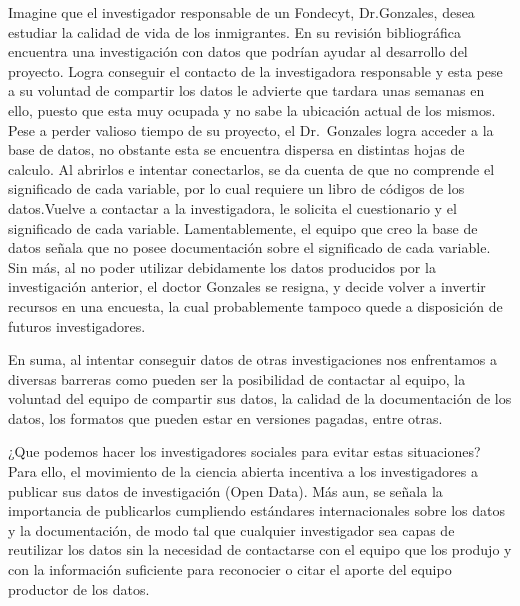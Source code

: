 \documentclass[
  14pt,
]{book}
\begin{document}
Imagine que el investigador responsable de un Fondecyt, Dr.Gonzales, desea estudiar la calidad de vida de los inmigrantes. En su revisión bibliográfica encuentra una investigación con datos que podrían ayudar al desarrollo del proyecto. Logra conseguir el contacto de la investigadora responsable y esta pese a su voluntad de compartir los datos le advierte que tardara unas semanas en ello, puesto que esta muy ocupada y no sabe la ubicación actual de los mismos. Pese a perder valioso tiempo de su proyecto, el Dr.~Gonzales logra acceder a la base de datos, no obstante esta se encuentra dispersa en distintas hojas de calculo. Al abrirlos e intentar conectarlos, se da cuenta de que no comprende el significado de cada variable, por lo cual requiere un libro de códigos de los datos.Vuelve a contactar a la investigadora, le solicita el cuestionario y el significado de cada variable. Lamentablemente, el equipo que creo la base de datos señala que no posee documentación sobre el significado de cada variable. Sin más, al no poder utilizar debidamente los datos producidos por la investigación anterior, el doctor Gonzales se resigna, y decide volver a invertir recursos en una encuesta, la cual probablemente tampoco quede a disposición de futuros investigadores.

En suma, al intentar conseguir datos de otras investigaciones nos enfrentamos a diversas barreras como pueden ser la posibilidad de contactar al equipo, la voluntad del equipo de compartir sus datos, la calidad de la documentación de los datos, los formatos que pueden estar en versiones pagadas, entre otras.

¿Que podemos hacer los investigadores sociales para evitar estas situaciones? Para ello, el movimiento de la ciencia abierta incentiva a los investigadores a publicar sus datos de investigación (Open Data). Más aun, se señala la importancia de publicarlos cumpliendo estándares internacionales sobre los datos y la documentación, de modo tal que cualquier investigador sea capas de reutilizar los datos sin la necesidad de contactarse con el equipo que los produjo y con la información suficiente para reconocier o citar el aporte del equipo productor de los datos.
\end{document}
